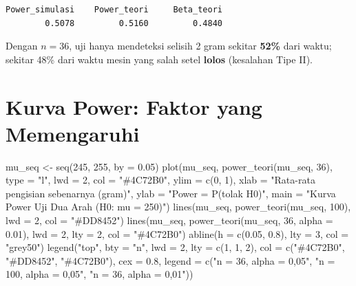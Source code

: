 \documentclass[
  indonesian,
  letterpaper,
]{book}
\newenvironment{Shaded}{\begin{snugshade}}{\end{snugshade}}
\newcommand{\AttributeTok}[1]{\textcolor[rgb]{0.40,0.45,0.13}{#1}}
\newcommand{\DecValTok}[1]{\textcolor[rgb]{0.68,0.00,0.00}{#1}}
\newcommand{\FloatTok}[1]{\textcolor[rgb]{0.68,0.00,0.00}{#1}}
\newcommand{\FunctionTok}[1]{\textcolor[rgb]{0.28,0.35,0.67}{#1}}
\newcommand{\NormalTok}[1]{\textcolor[rgb]{0.00,0.23,0.31}{#1}}
\newcommand{\OtherTok}[1]{\textcolor[rgb]{0.00,0.23,0.31}{#1}}
\newcommand{\StringTok}[1]{\textcolor[rgb]{0.13,0.47,0.30}{#1}}
\begin{document}
\begin{verbatim}
Power_simulasi    Power_teori     Beta_teori 
        0.5078         0.5160         0.4840 
\end{verbatim}

Dengan \(n = 36\), uji hanya mendeteksi selisih 2 gram sekitar
\textbf{52\%} dari waktu; sekitar 48\% dari waktu mesin yang salah setel
\textbf{lolos} (kesalahan Tipe II).

\section{Kurva Power: Faktor yang
Memengaruhi}\label{kurva-power-faktor-yang-memengaruhi}

\begin{Shaded}
\begin{Highlighting}[]
\NormalTok{mu\_seq }\OtherTok{\textless{}{-}} \FunctionTok{seq}\NormalTok{(}\DecValTok{245}\NormalTok{, }\DecValTok{255}\NormalTok{, }\AttributeTok{by =} \FloatTok{0.05}\NormalTok{)}
\FunctionTok{plot}\NormalTok{(mu\_seq, }\FunctionTok{power\_teori}\NormalTok{(mu\_seq, }\DecValTok{36}\NormalTok{), }\AttributeTok{type =} \StringTok{"l"}\NormalTok{, }\AttributeTok{lwd =} \DecValTok{2}\NormalTok{, }\AttributeTok{col =} \StringTok{"\#4C72B0"}\NormalTok{, }\AttributeTok{ylim =} \FunctionTok{c}\NormalTok{(}\DecValTok{0}\NormalTok{, }\DecValTok{1}\NormalTok{),}
     \AttributeTok{xlab =} \StringTok{"Rata{-}rata pengisian sebenarnya (gram)"}\NormalTok{, }\AttributeTok{ylab =} \StringTok{"Power = P(tolak H0)"}\NormalTok{,}
     \AttributeTok{main =} \StringTok{"Kurva Power Uji Dua Arah (H0: mu = 250)"}\NormalTok{)}
\FunctionTok{lines}\NormalTok{(mu\_seq, }\FunctionTok{power\_teori}\NormalTok{(mu\_seq, }\DecValTok{100}\NormalTok{), }\AttributeTok{lwd =} \DecValTok{2}\NormalTok{, }\AttributeTok{col =} \StringTok{"\#DD8452"}\NormalTok{)}
\FunctionTok{lines}\NormalTok{(mu\_seq, }\FunctionTok{power\_teori}\NormalTok{(mu\_seq, }\DecValTok{36}\NormalTok{, }\AttributeTok{alpha =} \FloatTok{0.01}\NormalTok{), }\AttributeTok{lwd =} \DecValTok{2}\NormalTok{, }\AttributeTok{lty =} \DecValTok{2}\NormalTok{, }\AttributeTok{col =} \StringTok{"\#4C72B0"}\NormalTok{)}
\FunctionTok{abline}\NormalTok{(}\AttributeTok{h =} \FunctionTok{c}\NormalTok{(}\FloatTok{0.05}\NormalTok{, }\FloatTok{0.8}\NormalTok{), }\AttributeTok{lty =} \DecValTok{3}\NormalTok{, }\AttributeTok{col =} \StringTok{"grey50"}\NormalTok{)}
\FunctionTok{legend}\NormalTok{(}\StringTok{"top"}\NormalTok{, }\AttributeTok{bty =} \StringTok{"n"}\NormalTok{, }\AttributeTok{lwd =} \DecValTok{2}\NormalTok{, }\AttributeTok{lty =} \FunctionTok{c}\NormalTok{(}\DecValTok{1}\NormalTok{, }\DecValTok{1}\NormalTok{, }\DecValTok{2}\NormalTok{), }\AttributeTok{col =} \FunctionTok{c}\NormalTok{(}\StringTok{"\#4C72B0"}\NormalTok{, }\StringTok{"\#DD8452"}\NormalTok{, }\StringTok{"\#4C72B0"}\NormalTok{), }\AttributeTok{cex =} \FloatTok{0.8}\NormalTok{,}
       \AttributeTok{legend =} \FunctionTok{c}\NormalTok{(}\StringTok{"n = 36, alpha = 0,05"}\NormalTok{, }\StringTok{"n = 100, alpha = 0,05"}\NormalTok{, }\StringTok{"n = 36, alpha = 0,01"}\NormalTok{))}
\end{Highlighting}
\end{Shaded}
\end{document}
